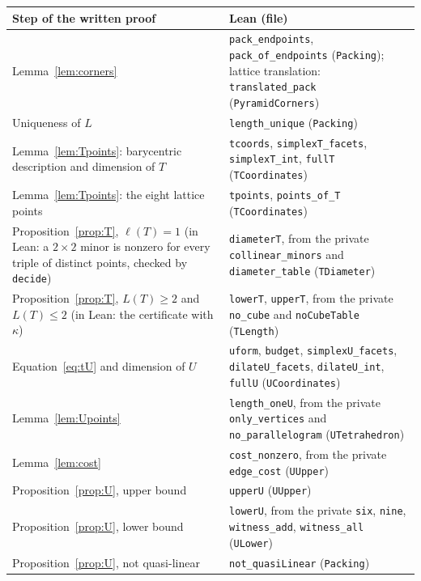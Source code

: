 \documentclass[11pt]{article}
\theoremstyle{definition}
\theoremstyle{remark}
\begin{document}
{\begin{table}[ht]
\centering\footnotesize
\renewcommand{\arraystretch}{1.08}
\begin{tabular}{@{}>{\raggedright\arraybackslash}p{}>{\raggedright\arraybackslash}p{}@{}}
\hline
Step of the written proof & Lean (file) \\
\hline
Lemma~\ref{lem:corners} &
\texttt{pack\_endpoints}, \texttt{pack\_of\_endpoints} (\texttt{Packing});
lattice translation: \texttt{translated\_pack} (\texttt{PyramidCorners}) \\
Uniqueness of $L$ & \texttt{length\_unique} (\texttt{Packing}) \\
Lemma~\ref{lem:Tpoints}: barycentric description and dimension of $T$ &
\texttt{tcoords}, \texttt{simplexT\_facets}, \texttt{simplexT\_int},
\texttt{fullT} (\texttt{TCoordinates}) \\
Lemma~\ref{lem:Tpoints}: the eight lattice points &
\texttt{tpoints}, \texttt{points\_of\_T} (\texttt{TCoordinates}) \\
Proposition~\ref{prop:T}, $\ell(T)=1$ (in Lean: a $2\times2$ minor is
nonzero for every triple of distinct points, checked by \texttt{decide}) &
\texttt{diameterT}, from the private \texttt{collinear\_minors} and
\texttt{diameter\_table} (\texttt{TDiameter}) \\
Proposition~\ref{prop:T}, $L(T)\ge2$ and $L(T)\le2$ (in Lean: the
certificate with $\kappa$) &
\texttt{lowerT}, \texttt{upperT}, from the private \texttt{no\_cube} and
\texttt{noCubeTable} (\texttt{TLength}) \\
Equation~\eqref{eq:tU} and dimension of $U$ &
\texttt{uform}, \texttt{budget}, \texttt{simplexU\_facets},
\texttt{dilateU\_facets}, \texttt{dilateU\_int}, \texttt{fullU}
(\texttt{UCoordinates}) \\
Lemma~\ref{lem:Upoints} &
\texttt{length\_oneU}, from the private \texttt{only\_vertices} and
\texttt{no\_parallelogram} (\texttt{UTetrahedron}) \\
Lemma~\ref{lem:cost} &
\texttt{cost\_nonzero}, from the private \texttt{edge\_cost} (\texttt{UUpper}) \\
Proposition~\ref{prop:U}, upper bound & \texttt{upperU} (\texttt{UUpper}) \\
Proposition~\ref{prop:U}, lower bound &
\texttt{lowerU}, from the private \texttt{six}, \texttt{nine},
\texttt{witness\_add}, \texttt{witness\_all} (\texttt{ULower}) \\
Proposition~\ref{prop:U}, not quasi-linear &
\texttt{not\_quasiLinear} (\texttt{Packing}) \\

\end{tabular}
\end{table}}
\end{document}
